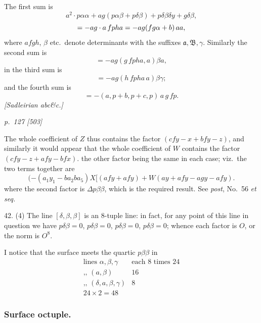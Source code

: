 \documentclass[11pt,a4paper]{book}
\begin{document}
The first sum is
\[
a^2 \cdot p\alpha\alpha + a g (p\alpha\beta + p\delta\beta) + p\delta\beta\delta y + g\delta\beta,
\]
\[
= -ag \cdot a\,fpha\\
= -a g (fg\alpha + b)\,a a,
\]
where $afgh$, $\beta$ etc.\ denote determinants with the suffixes $\mathfrak{a}, \mathfrak{B}, \gamma$. Similarly the second
sum is
\[
= -a g (g\,fpha,a)\beta a,
\]
in the third sum is
\[
=-a g (h\,fpha\,a)\beta\gamma;
\]
and the fourth sum is
\[
=-(a,p+b,p+c,p)\,a\,g\,fp.
\]
\textit{[Sadleirian abc\&c.]}

\clearpage

\bigskip
\textit{p.~127 [503]}
\smallskip

\noindent
The whole coefficient of $Z$ thus contains the factor $(cf y - x + b f y - z)$, and similarly it
would appear that the whole coefficient of $W$ contains the factor $(cf y - z + a f y - b f x)$.
the other factor being the same in each case; viz.\ the two terms together are
\[
(- (a_1 y_1 - b a_2 b a_5) X [(a f y + a f y) + W (a y + a f y - a g y - a f y).
\]
where the second factor is $\Delta p\beta\beta$, which is the required result. See \textit{post}, No.\ 56
\textit{et seq.}

42. (4) The line $[\delta, \beta, \beta]$ is an 8-tuple line: in fact, for any point of this
line in question we have $p\delta\beta = 0$, $p\delta\beta = 0$, $p\delta\beta = 0$, $p\delta\beta = 0$; whence each factor
is $O$, or the norm is $O^8$.

I notice that the surface meets the quartic $p\beta\beta$ in
\[
\begin{array}{ll}
\text{lines } \alpha, \beta, \gamma & \text{each 8 times } 24 \\
\text{,, } (a, \beta) & 16 \\
\text{,, } (\delta, a, \beta, \gamma) & 8 \\
\hline
24 \times 2 = 48
\end{array}
\]

\subsubsection*{Surface octuple.}
\end{document}
